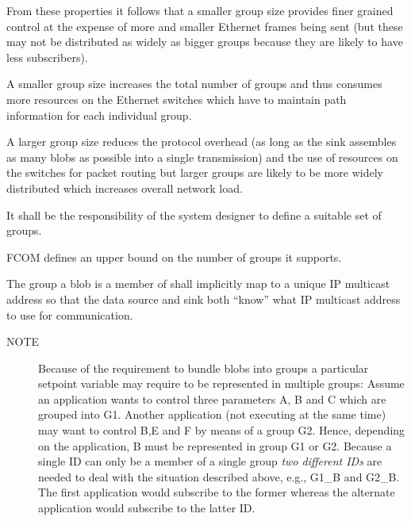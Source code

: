 \documentclass[11pt]{article}
\newcommand{\fcom}{FCOM}
\newcommand{\blob}{blob}
\newcommand{\group}{group}
\newcommand{\note}[1]{
	\begin{description}
		\item[NOTE] #1
	\end{description}
}
\begin{document}
                    From these properties it follows that
                    a smaller group size provides finer grained
                    control at the expense of more and smaller Ethernet
                    frames
                    being sent (but these may not be distributed
                    as widely as bigger groups because they are
                    likely to have less subscribers).

                    A smaller group size increases the total number
                    of groups and thus consumes more resources on
                    the Ethernet switches which have to maintain
                    path information for each individual group.

                    A larger group size reduces the protocol
                    overhead (as long as the sink assembles
                    as many \blob{}s as possible into a single
                    transmission) and the use of resources on the
                    switches for packet routing but larger groups
                    are likely to be more widely distributed which
                    increases overall network load.

                    It shall be the responsibility of the system
                    designer to define a suitable set of \group{}s.

                    \fcom{} defines an upper bound on the number
                    of \group{}s it supports.

                    The \group{} a \blob{} is a member of shall
                    implicitly map to a unique IP multicast address
                    so that the data source and sink both ``know''
                    what IP multicast address to use for communication.

                    \note{Because of the requirement to bundle
                    \blob{}s into \group{}s a particular 
                    setpoint variable may require to be represented
                    in multiple groups: Assume an application wants
                    to control three parameters A, B and C which
                    are grouped into G1. Another application (not
                    executing at the same time) may want to control
                    B,E and F by means of a group G2. Hence, depending
                    on the application, B must be represented in group
                    G1 or G2. Because a single ID can only be a
                    member of a single group {\em two different IDs} 
                    are needed to deal with the situation described
                    above, e.g., G1\_B and G2\_B. The first application
                    would subscribe to the former whereas the alternate
                    application would subscribe to the latter ID.}
\end{document}
